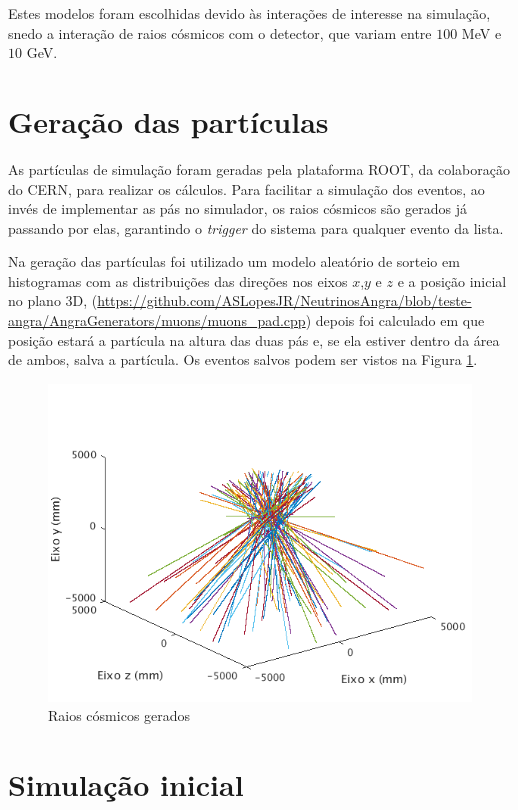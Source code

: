 Estes modelos foram escolhidas devido às interações de interesse na simulação, snedo a interação de raios cósmicos com o detector, que variam entre $100$ MeV e $10$ GeV.


\section{Geração das partículas}

As partículas de simulação foram geradas pela plataforma ROOT, da colaboração do \ac{CERN}, para realizar os cálculos. Para facilitar a simulação dos eventos, ao invés de implementar as pás no simulador, os raios cósmicos são gerados já passando por elas, garantindo o \emph{trigger} do sistema para qualquer evento da lista. 

 Na geração das partículas foi utilizado um modelo aleatório de sorteio em histogramas com as distribuições das direções nos eixos $x$,$y$ e $z$ e a posição inicial no plano 3D, (\url{https://github.com/ASLopesJR/NeutrinosAngra/blob/teste-angra/AngraGenerators/muons/muons_pad.cpp}) depois foi calculado em que posição estará a partícula na altura das duas pás e, se ela estiver dentro da área de ambos, salva a partícula. Os eventos salvos podem ser vistos na Figura \ref{fig:geracao}.

\begin{figure}[H]
	\centering
	\includegraphics[width=16cm]{textuais/simulacao/figuras/geracao.png}
	\caption{Raios cósmicos gerados}
	\label{fig:geracao}
\end{figure}


\section{Simulação inicial}

